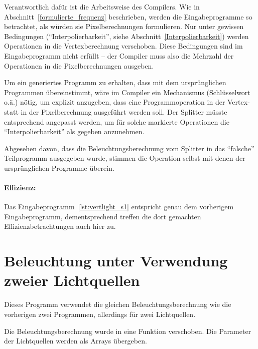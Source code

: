 \documentclass[twoside,a4paper,fleqn,12pt]{book}
\begin{document}
Verantwortlich dafür ist die Arbeitsweise des Compilers. Wie in Abschnitt~\ref{formulierte_frequenz} beschrieben,
werden die Eingabeprogramme so betrachtet, als würden sie Pixelberechnungen formulieren.
Nur unter gewissen Bedingungen ("`Interpolierbarkeit"', siehe Abschnitt~\ref{Interpolierbarkeit}) werden
Operationen in die Vertexberechnung verschoben. Diese Bedingungen sind im Eingabeprogramm nicht erfüllt --
der Compiler muss also die Mehrzahl der Operationen in die Pixelberechnungen ausgeben.

Um ein generiertes Programm zu erhalten, dass mit dem ursprünglichen Programmen übereinstimmt, wäre im Compiler ein Mechanismus
(Schlüsselwort o.ä.) nötig, um explizit anzugeben, dass eine Programmoperation in der Vertex- statt in der Pixelberechnung ausgeführt werden soll.
Der Splitter müsste entsprechend angepasst werden, um für solche markierte Operationen die "`Interpolierbarkeit"' als gegeben anzunehmen.

Abgesehen davon, dass die Beleuchtungsberechnung vom Splitter in das "`falsche"' Teilprogramm ausgegeben wurde,
stimmen die Operation selbst mit denen der ursprünglichen Programme überein.

\paragraph{Effizienz:}
Das Eingabeprogramm~\ref{lst:vertlight_s1} entspricht genau dem vorherigem Eingabeprogramm, dementsprechend treffen
die dort gemachten Effizienzbetrachtungen auch hier zu.

\section{Beleuchtung unter Verwendung zweier Lichtquellen}

Dieses Programm verwendet die gleichen Beleuchtungsberechnung wie die vorherigen zwei Programmen,
allerdings für zwei Lichtquellen.


{}

{}

Die Beleuchtungsberechnung wurde in eine Funktion verschoben. Die Parameter der Lichtquellen werden als
Arrays übergeben.
\end{document}
